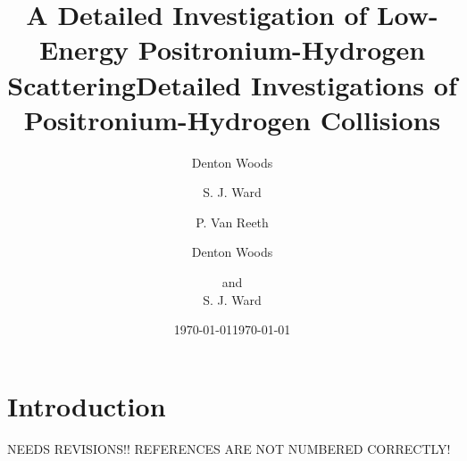\documentclass[preprint,showpacs,preprintnumbers,amsmath,amssymb]{revtex4}
\begin{document}

\title {A Detailed Investigation of Low-Energy Positronium-Hydrogen Scattering}

\author{Denton Woods }
\author{S. J. Ward}

\author{ P. Van Reeth}

\date{\today}%

\begin{abstract}



   \end{abstract}
   
\maketitle

\section{\label{sec:Intro}\protect Introduction}




\title{Detailed Investigations of Positronium-Hydrogen Collisions}

\author{Denton Woods }
\author{and \\ S. J. Ward}%


\date{\today}%


\noindent
NEEDS REVISIONS!!
REFERENCES ARE NOT NUMBERED CORRECTLY!
\end{document}

